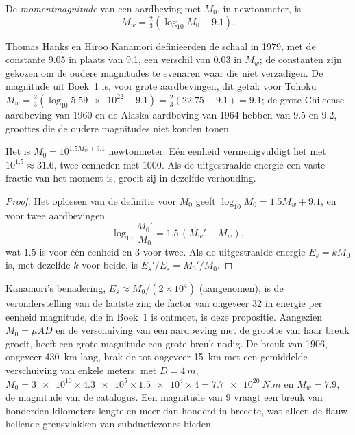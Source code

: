 \begin{definition}[Momentmagnitude]\label{def:b1:earthquake-source:mw}
De \emph{momentmagnitude} van een aardbeving met  $M_0$, in newtonmeter, is
\[
  M_w = \tfrac23\left(\log_{10} M_0 - 9.1\right) .
\]
\end{definition}

Thomas Hanks en Hiroo Kanamori definieerden de schaal in 1979, met de constante 9.05 in plaats van 9.1, een verschil van 0.03 in $M_w$; de constanten zijn gekozen om de oudere magnitudes te evenaren waar die niet verzadigen. De magnitude uit Boek~1 is, voor grote aardbevingen, dit getal: voor Tohoku
$M_w = \tfrac23(\log_{10}\num{5.59e22} - 9.1) = \tfrac23(22.75 - 9.1) = 9.1$;
de grote Chileense aardbeving van 1960 en de Alaska-aardbeving van 1964 hebben  van 9.5 en 9.2, groottes die de oudere magnitudes niet konden tonen.

\begin{proposition}\label{prop:b1:earthquake-source:moment-steps}
Het  is $M_0 = 10^{1.5 M_w + 9.1}$ newtonmeter. Eén eenheid  vermenigvuldigt het met $10^{1.5} \approx 31.6$, twee eenheden met $1000$. Als de uitgestraalde energie een vaste fractie van het moment is, groeit zij in dezelfde verhouding.
\end{proposition}

\begin{proof}
Het oplossen van de definitie voor $M_0$ geeft $\log_{10} M_0 = 1.5 M_w + 9.1$, en voor twee aardbevingen
\[
  \log_{10}\frac{M_0'}{M_0} = 1.5\,(M_w' - M_w) ,
\]
wat $1.5$ is voor één eenheid en $3$ voor twee. Als de uitgestraalde energie $E_s = k M_0$ is, met dezelfde $k$ voor beide, is $E_s'/E_s = M_0'/M_0$.
\end{proof}

Kanamori's benadering, $E_s \approx M_0/(2\times10^4)$ (aangenomen), is de veronderstelling van de laatste zin; de factor van ongeveer 32 in energie per eenheid magnitude, die in Boek~1 is ontmoet, is deze propositie. Aangezien $M_0 = \mu A D$ en de verschuiving van een aardbeving met de grootte van haar breuk groeit, heeft een grote magnitude een grote breuk nodig. De breuk van 1906, ongeveer \qty{430}{km} lang, brak de  tot ongeveer \qty{15}{km} met een gemiddelde verschuiving van enkele meters: met $D = \qty{4}{m}$, $M_0 = \num{3e10}\times\num{4.3e5}\times\num{1.5e4}
\times 4 = \qty{7.7e20}{N.m}$ en $M_w = 7.9$, de magnitude van de catalogus. Een magnitude van 9 vraagt een breuk van honderden kilometers lengte en meer dan honderd in breedte, wat alleen de flauw hellende grensvlakken van subductiezones bieden.

